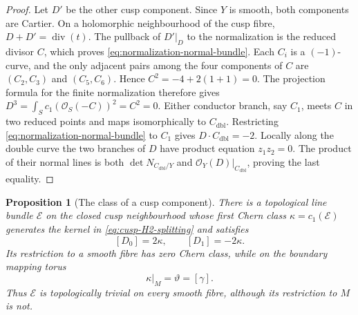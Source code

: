 \documentclass[11pt]{article}
\newtheorem{proposition}[theorem]{Proposition}
\theoremstyle{definition}
\theoremstyle{remark}
\numberwithin{equation}{section}
\begin{document}
\begin{proof}
Let $D'$ be the other cusp component.  Since $Y$ is smooth, both
components are Cartier.  On a holomorphic neighbourhood of the cusp fibre,
$D+D'=\operatorname{div}(t)$.  The pullback of $D'|_D$ to the
normalization is the reduced divisor $C$, which proves
\eqref{eq:normalization-normal-bundle}.  Each $C_i$ is a $(-1)$-curve,
and the only adjacent pairs among the four components of $C$ are
$(C_2,C_3)$ and $(C_5,C_6)$.  Hence
$C^2=-4+2(1+1)=0$.  The projection formula for the finite normalization
therefore gives
$D^3=\int_S c_1(\mathcal O_S(-C))^2=C^2=0$.
Either conductor branch, say $C_1$, meets $C$ in two reduced points and
maps isomorphically to $C_{\mathrm{dbl}}$.  Restricting
\eqref{eq:normalization-normal-bundle} to $C_1$ gives
$D\cdot C_{\mathrm{dbl}}=-2$.  Locally along the double curve the two
branches of $D$ have product equation $z_1z_2=0$.  The product of their
normal lines is both $\det N_{C_{\mathrm{dbl}}/Y}$ and
$\mathcal O_Y(D)|_{C_{\mathrm{dbl}}}$, proving the last equality.
\end{proof}

\begin{proposition}[The class of a cusp component]
\label{prop:cusp-component-class}
There is a topological line bundle $\mathcal E$ on the closed cusp neighbourhood
whose first Chern class $\kappa=c_1(\mathcal E)$ generates the kernel in
\eqref{eq:cusp-H2-splitting} and satisfies
\begin{equation}\label{eq:cusp-component-class}
 [D_0]=2\kappa,\qquad [D_1]=-2\kappa.
\end{equation}
Its restriction to a smooth fibre has zero Chern class, while on the boundary
mapping torus
\begin{equation}\label{eq:kappa-boundary}
 \kappa|_M=\vartheta=[\gamma].
\end{equation}
Thus $\mathcal E$ is topologically trivial on every smooth fibre, although
its restriction to $M$ is not.
\end{proposition}
\end{document}
